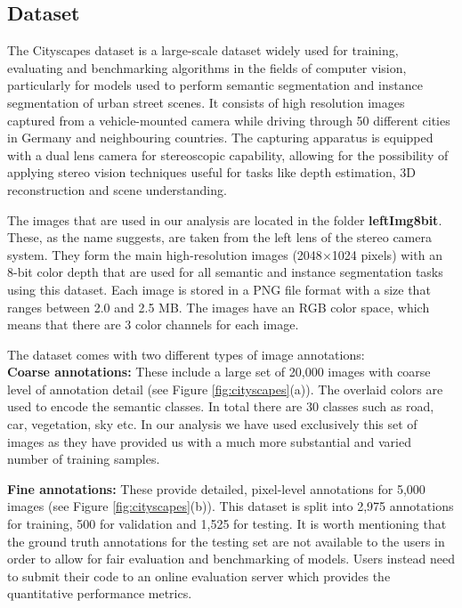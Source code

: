 \subsection{Dataset}

The Cityscapes dataset is a large-scale dataset widely used for training, evaluating and benchmarking algorithms in the fields of computer vision, particularly for models used to perform semantic segmentation and instance segmentation of urban street scenes. It consists of high resolution images captured from a vehicle-mounted camera while driving through 50 different cities in Germany and neighbouring countries. The capturing apparatus is equipped with a dual lens camera for stereoscopic capability, allowing for the possibility of applying stereo vision techniques useful for tasks like depth estimation, 3D reconstruction and scene understanding. 

The images that are used in our analysis are located in the folder \textbf{leftImg8bit}. These, as the name suggests, are taken from the left lens of the stereo camera system. They form the main high-resolution images (2048$\times$1024 pixels) with an 8-bit color depth that are used for all semantic and instance segmentation tasks using this dataset. Each image is stored in a PNG file format with a size that ranges between 2.0 and 2.5 MB. The images have an RGB color space, which means that there are 3 color channels for each image.

The dataset comes with two different types of image annotations:\\
\textbf{Coarse annotations:} These include a large set of 20,000 images with coarse level of annotation detail (see Figure \ref{fig:cityscapes}(a)). The overlaid colors are used to encode the semantic classes. In total there are 30 classes such as road, car, vegetation, sky etc. In our analysis we have used exclusively this set of images as they have provided us with a much more substantial and varied number of training samples. 

\textbf{Fine annotations:} These provide detailed, pixel-level annotations for 5,000 images (see Figure \ref{fig:cityscapes}(b)). This dataset is split into 2,975 annotations for training, 500 for validation and 1,525 for testing. It is worth mentioning that the ground truth annotations for the testing set are not available to the users in order to allow for fair evaluation and benchmarking of models. Users instead need to submit their code to an online evaluation server which provides the quantitative performance metrics. 

